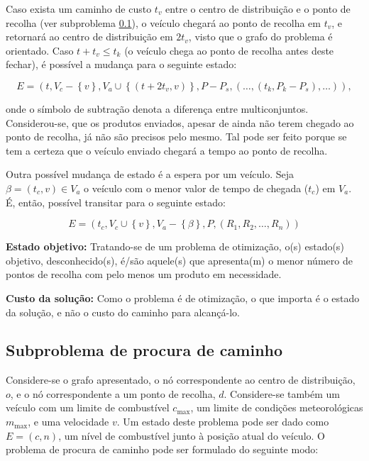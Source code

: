 \documentclass[12pt, a4paper]{article}
\begin{document}
Caso exista um caminho de custo $t_v$ entre o centro de distribuição e o ponto de recolha (ver
subproblema \ref{subproblem}), o veículo chegará ao ponto de recolha em $t_v$, e retornará ao centro
de distribuição em $2t_v$, visto que o grafo do problema é orientado. Caso $t + t_v \le t_k$ (o
veículo chega ao ponto de recolha antes deste fechar), é possível a mudança para o seguinte estado:

$$
E = \left (
    t,
    V_c - \left \lbrace v \right \rbrace,
    V_a \cup \left \lbrace (t + 2t_v, v) \right \rbrace,
    P - P_s,
    \left ( \ldots, (t_k, P_k - P_s), \ldots \right )
\right ),
$$

onde o símbolo de subtração denota a diferença entre multiconjuntos. Considerou-se, que os produtos
enviados, apesar de ainda não terem chegado ao ponto de recolha, já não são precisos pelo mesmo. Tal
pode ser feito porque se tem a certeza que o veículo enviado chegará a tempo ao ponto de recolha.

Outra possível mudança de estado é a espera por um veículo. Seja $\beta = (t_c, v) \in V_a$ o
veículo com o menor valor de tempo de chegada ($t_c$) em $V_a$. É, então, possível transitar para o
seguinte estado:

$$
E = \left (
    t_c,
    V_c \cup \left \lbrace v \right \rbrace,
    V_a - \left \lbrace \beta \right \rbrace,
    P,
    (R_1, R_2, \ldots, R_n)
\right )
$$

\textbf{Estado objetivo:} Tratando-se de um problema de otimização, o(s) estado(s) objetivo,
desconhecido(s), é/são aquele(s) que apresenta(m) o menor número de pontos de recolha com pelo menos
um produto em necessidade.

\textbf{Custo da solução:} Como o problema é de otimização, o que importa é o estado da solução, e
não o custo do caminho para alcançá-lo.

\subsection{Subproblema de procura de caminho}
\label{subproblem}

Considere-se o grafo apresentado, o nó correspondente ao centro de distribuição, $o$, e o nó
correspondente a um ponto de recolha, $d$. Considere-se também um veículo com um limite de
combustível $c_\text{max}$, um limite de condições meteorológicas $m_\text{max}$, e uma velocidade
$v$. Um estado deste problema pode ser dado como $E = (c, n)$, um nível de combustível junto à
posição atual do veículo. O problema de procura de caminho pode ser formulado do seguinte modo:
\end{document}
